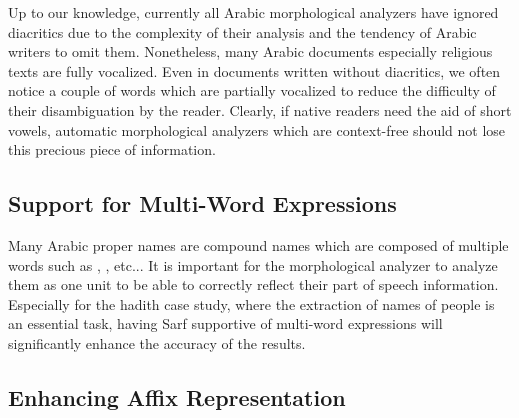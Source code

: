 \documentclass[a4,12pt]{report}
\newcommand{\noVocRL}[1]{\transtrue\novocalize\RL{#1}\vocalize}
\begin{document}
Up to our knowledge, currently all Arabic morphological analyzers have ignored diacritics due to the complexity 
of their analysis and the tendency of Arabic writers to omit them.
Nonetheless, many Arabic documents especially religious texts are fully vocalized.
Even in documents written without diacritics, we often notice 
a couple of words which are partially vocalized
to reduce the difficulty of their disambiguation by the reader. Clearly, if native readers
need the aid of short vowels, automatic morphological analyzers which are context-free should not lose this precious piece of information.

\subsection{Support for Multi-Word Expressions} %

Many Arabic proper names are compound names which are composed of multiple words such as 
\noVocRL{bayt la.hem}, \noVocRL{`bd al-razAq}, etc...
It is important for the morphological analyzer to analyze them as one unit to be able to
correctly reflect their part of speech information. Especially for the hadith case study,
where the extraction of names of people is an essential task, having Sarf supportive of
multi-word expressions will significantly enhance the accuracy of the results.

\subsection{Enhancing Affix Representation}
\end{document}
